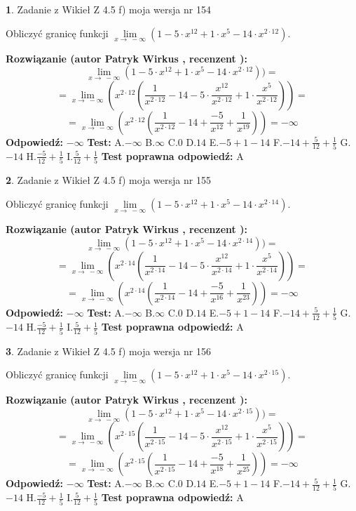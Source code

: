 \documentclass[12pt, a4paper]{article}
\theoremstyle{definition} %
\newtheorem{zad}{}
\newcommand{\zadStart}[1]{\begin{zad}#1\newline}
\newcommand{\zadStop}{\end{zad}}
\newcommand{\rozwStart}[2]{\noindent \textbf{Rozwiązanie (autor #1 , recenzent #2): }\newline}
\newcommand{\rozwStop}{\newline}
\newcommand{\odpStart}{\noindent \textbf{Odpowiedź:}\newline}
\newcommand{\odpStop}{\newline}
\newcommand{\testStart}{\noindent \textbf{Test:}\newline}
\newcommand{\testStop}{\newline}
\newcommand{\kluczStart}{\noindent \textbf{Test poprawna odpowiedź:}\newline}
\newcommand{\kluczStop}{\newline}
\begin{document}
\zadStart{Zadanie z Wikieł Z 4.5 f) moja wersja nr 154}



Obliczyć granicę funkcji  $\lim\limits_{x\to\ -\infty}(1 - 5 \cdot x^{12}+1 \cdot x^{5}- 14 \cdot x^{2\cdot12})$.
\zadStop
\rozwStart{Patryk Wirkus}{}
$$\lim\limits_{x\to\ -\infty}(1 - 5 \cdot x^{12}+1 \cdot x^{5}- 14 \cdot x^{2\cdot12}))=$$
$$=\lim\limits_{x\to\ -\infty}(x^{2\cdot12}(\frac{1}{x^{2\cdot12}}-14 -5 \cdot \frac{x^{12}}{x^{2\cdot12}}+1 \cdot \frac{x^{5}}{x^{2\cdot12}}))=$$
$$=\lim\limits_{x\to\ -\infty}(x^{2\cdot12}(\frac{1}{x^{2\cdot12}}-14 + \frac{-5}{x^{12}}+ \frac{1}{x^{19}}))=-\infty$$
\rozwStop
\odpStart
$-\infty$
\odpStop
\testStart
A.$-\infty$ B.$\infty$ C.$0$ D.$14$ E.$-5 + 1 - 14$
F.$-14+\frac{5}{12}+\frac{1}{5}$ G.$-14$
H.$\frac{-5}{12}+\frac{1}{5}$
I.$\frac{5}{12}+\frac{1}{5}$
\testStop
\kluczStart
A
\kluczStop



\zadStart{Zadanie z Wikieł Z 4.5 f) moja wersja nr 155}



Obliczyć granicę funkcji  $\lim\limits_{x\to\ -\infty}(1 - 5 \cdot x^{12}+1 \cdot x^{5}- 14 \cdot x^{2\cdot14})$.
\zadStop
\rozwStart{Patryk Wirkus}{}
$$\lim\limits_{x\to\ -\infty}(1 - 5 \cdot x^{12}+1 \cdot x^{5}- 14 \cdot x^{2\cdot14}))=$$
$$=\lim\limits_{x\to\ -\infty}(x^{2\cdot14}(\frac{1}{x^{2\cdot14}}-14 -5 \cdot \frac{x^{12}}{x^{2\cdot14}}+1 \cdot \frac{x^{5}}{x^{2\cdot14}}))=$$
$$=\lim\limits_{x\to\ -\infty}(x^{2\cdot14}(\frac{1}{x^{2\cdot14}}-14 + \frac{-5}{x^{16}}+ \frac{1}{x^{23}}))=-\infty$$
\rozwStop
\odpStart
$-\infty$
\odpStop
\testStart
A.$-\infty$ B.$\infty$ C.$0$ D.$14$ E.$-5 + 1 - 14$
F.$-14+\frac{5}{12}+\frac{1}{5}$ G.$-14$
H.$\frac{-5}{12}+\frac{1}{5}$
I.$\frac{5}{12}+\frac{1}{5}$
\testStop
\kluczStart
A
\kluczStop



\zadStart{Zadanie z Wikieł Z 4.5 f) moja wersja nr 156}



Obliczyć granicę funkcji  $\lim\limits_{x\to\ -\infty}(1 - 5 \cdot x^{12}+1 \cdot x^{5}- 14 \cdot x^{2\cdot15})$.
\zadStop
\rozwStart{Patryk Wirkus}{}
$$\lim\limits_{x\to\ -\infty}(1 - 5 \cdot x^{12}+1 \cdot x^{5}- 14 \cdot x^{2\cdot15}))=$$
$$=\lim\limits_{x\to\ -\infty}(x^{2\cdot15}(\frac{1}{x^{2\cdot15}}-14 -5 \cdot \frac{x^{12}}{x^{2\cdot15}}+1 \cdot \frac{x^{5}}{x^{2\cdot15}}))=$$
$$=\lim\limits_{x\to\ -\infty}(x^{2\cdot15}(\frac{1}{x^{2\cdot15}}-14 + \frac{-5}{x^{18}}+ \frac{1}{x^{25}}))=-\infty$$
\rozwStop
\odpStart
$-\infty$
\odpStop
\testStart
A.$-\infty$ B.$\infty$ C.$0$ D.$14$ E.$-5 + 1 - 14$
F.$-14+\frac{5}{12}+\frac{1}{5}$ G.$-14$
H.$\frac{-5}{12}+\frac{1}{5}$
I.$\frac{5}{12}+\frac{1}{5}$
\testStop
\kluczStart
A
\kluczStop
\end{document}
